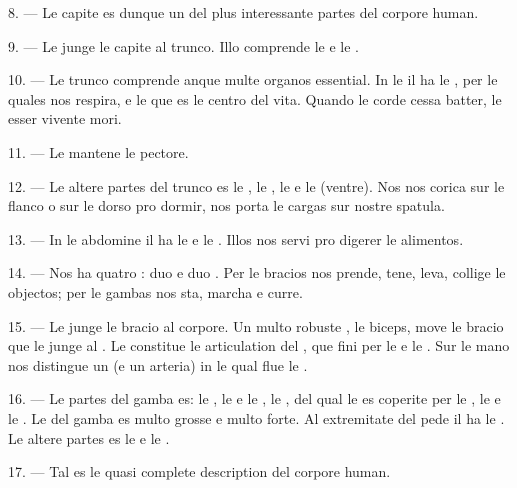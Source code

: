 8. --- Le capite es dunque un del plus interessante partes del corpore human.

\VUsaut{4.4mm}
\VUsaut{3.0mm}

9. --- Le  junge le capite al trunco. Illo comprende le
 e le .

10. --- Le trunco comprende anque multe organos essential. In le 
il ha le , per le quales nos respira, e le  que
es le centro del vita. Quando le corde cessa batter, le esser vivente mori.

11. --- Le  mantene le pectore.

12. --- Le altere partes del trunco es le , le , le
 e le  (ventre). Nos nos corica sur le flanco
o sur le dorso pro dormir, nos porta le cargas sur nostre spatula.

13. --- In le abdomine il ha le  e le .
Illos nos servi pro digerer le alimentos.

\VUsaut{4.4mm}
\VUsaut{3.0mm}

14. --- Nos ha quatro : duo  e duo
. Per le bracios nos prende, tene, leva, collige le objectos; per
le gambas nos sta, marcha e curre.

15. --- Le  junge le bracio al corpore. Un multo robuste
, le biceps, move le bracio que le  junge al
. Le  constitue le articulation del
, que fini per le  e le . Sur le
mano nos distingue un  (e un arteria) in le qual flue le
.

16. --- Le partes del gamba es: le , le  e le
, le , del qual le  es coperite per
le , le  e le . Le 
del gamba es multo grosse e multo forte. Al extremitate del pede il ha le
. Le altere partes es le  e le
.

17. --- Tal es le quasi complete description del corpore human.

